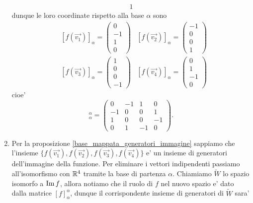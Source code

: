 \begin{solution}
\begin{enumerate}
\begin{alignat*}{1}
        \end{alignat*}
        dunque le loro coordinate rispetto alla base $\alpha$ sono
        \begin{align*}
            &[f(\vec{v_1})]_{\alpha} = \begin{pmatrix}
                0 \\ -1 \\ 1 \\ 0
            \end{pmatrix} &[f(\vec{v_2})]_{\alpha} = \begin{pmatrix}
                -1 \\ 0 \\ 0 \\ 1
            \end{pmatrix}
            \\&[f(\vec{v_3})]_{\alpha} = \begin{pmatrix}
                1 \\ 0 \\ 0 \\ -1
            \end{pmatrix} &[f(\vec{v_4})]_{\alpha} = \begin{pmatrix}
                0 \\ 1 \\ -1 \\ 0
            \end{pmatrix}
        \end{align*}
        cioe' \begin{equation*}
            [f]^{\alpha}_{\alpha} = \begin{pmatrix}
                0 & -1 & 1 & 0 \\ -1 & 0 & 0 & 1 \\
                1 & 0 & 0 & -1 \\ 0 & 1 & -1 & 0
            \end{pmatrix}.
        \end{equation*}
        \item Per la proposizione \ref{base_mappata_generatori_immagine} sappiamo che l'insieme
        $\{f(\vec{v_1}), f(\vec{v_2}), f(\vec{v_3}), f(\vec{v_4})\}$ e' un insieme di generatori dell'immagine della funzione. 
        Per eliminare i vettori indipendenti passiamo all'isomorfismo con $\mathbb{R}^4$ tramite la base di partenza $\alpha$. Chiamiamo $\widetilde{W}$ lo spazio isomorfo a $\operatorname{Im}f$, allora notiamo che il ruolo di $f$ nel nuovo spazio e' dato dalla matrice $[f]^{\alpha}_{\alpha}$, dunque il corrispondente insieme di generatori di $\widetilde{W}$ sara' \begin{gather*}

\end{gather*}
\end{enumerate}
\end{solution}
